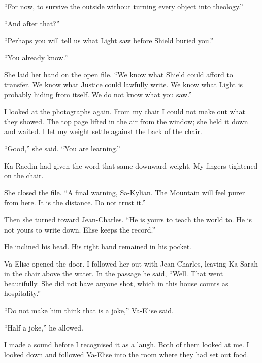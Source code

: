 ``For now, to survive the outside without turning every object into theology.''\par

``And after that?''\par

``Perhaps you will tell us what Light saw before Shield buried you.''\par

``You already know.''\par

She laid her hand on the open file. ``We know what Shield could afford to transfer. We know what Justice could lawfully write. We know what Light is probably hiding from itself. We do not know what you saw.''\par

I looked at the photographs again. From my chair I could not make out what they showed. The top page lifted in the air from the window; she held it down and waited. I let my weight settle against the back of the chair.\par

``Good,'' she said. ``You are learning.''\par

Ka-Raedin had given the word that same downward weight. My fingers tightened on the chair.\par

She closed the file. ``A final warning, Sa-Kylian. The Mountain will feel purer from here. It is the distance. Do not trust it.''\par

Then she turned toward Jean-Charles. ``He is yours to teach the world to. He is not yours to write down. Elise keeps the record.''\par

He inclined his head. His right hand remained in his pocket.\par

Va-Elise opened the door. I followed her out with Jean-Charles, leaving Ka-Sarah in the chair above the water. In the passage he said, ``Well. That went beautifully. She did not have anyone shot, which in this house counts as hospitality.''\par

``Do not make him think that is a joke,'' Va-Elise said.\par

``Half a joke,'' he allowed.\par

I made a sound before I recognised it as a laugh. Both of them looked at me. I looked down and followed Va-Elise into the room where they had set out food.\par

